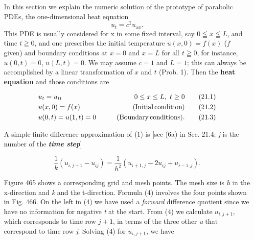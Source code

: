 In this section we explain the numeric solution of the prototype of parabolic PDEs, the one-dimensional heat equation
\begin{equation*}\tag{c constant}
u_{t}=c^2u_{xx}.  
\end{equation*}
This PDE is usually considered for x in some fixed interval, say $0\leqq x \leqq L$, and time $t\geqq0$, and one prescribes the initial temperature $u(x,0)=f(x)$ ($f$ given) and boundary conditions at $x=0$ and $x=L$ for all $t\geqq0$, for instance, $u(0,t)=0$, $u(L,t)=0$. We may assume $c=1$ and $L=1$; this can always be accomplished by a linear transformation of $x$ and $t$ (Prob. 1). Then the \textbf{heat equation} and those conditions are \\
\begin{graybox}
\begin{align}
& u_t = u_{tt} \hspace{0.8in}&{0\leq x \leq L, \,\, t \geq 0}&  \tag{21.1} \\
& u(x,0) = f(x)  \hspace{0.6in}&{\rm (Initial \, condition)}& \tag{21.2} \\
& u(0,t) = u(1,t)= 0 \hspace{0.2in}&{\rm (Boundary \, conditions).}& \tag{21.3}
\end{align}
\end{graybox}
A simple finite difference approximation of (1) is [see (6a) in Sec. 21.4; \textit{j} is the number of the \textbf{\textit{time step}}] \\
\begin{graybox}
\begin{equation} \tag{21.4}
\frac{1}{k}(u_{i,j+1}-u_{ij})=\frac{1}{h^2}(u_{i+1,j}-2u_{ij}+u_{i-1,j}).
\end{equation}
\end{graybox}
Figure 465 shows a corresponding grid and mesh points. The mesh size is \textit{h} in the x-direction and \textit{k} and the t-direction. Formula (4) involves the four points shown in Fig. 466. On the left in (4) we have used a \textit{forward} difference quotient since we have no information for negative \textit{t} at the start. From (4) we calculate $u_{i,j+1}$, which corresponds to time row $j+1$, in terms of the three other \textit{u} that correspond to time row \textit{j}. Solving (4) for $u_{i,j+1}$, we have
